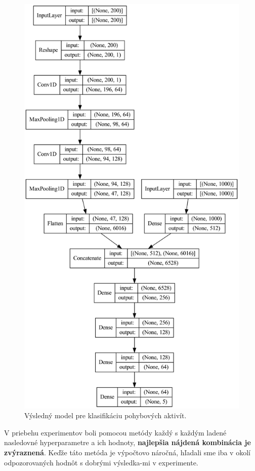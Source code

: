 \begin{figure}[H]
    \centering    
    \includegraphics[scale=0.075]{img/activity_classification_model.png}
    \caption{Výsledný model pre klasifikáciu pohybových aktivít.}
    \label{fig:activity_classification_model}
\end{figure}

V priebehu experimentov boli pomocou metódy každý s každým ladené nasledovné hyperparametre a ich hodnoty, \textbf{najlepšia nájdená kombinácia je zvýraznená}. Keďže táto metóda je výpočtovo náročná, hľadali sme iba v okolí odpozorovaných hodnôt s dobrými výsledka-mi v experimente.

